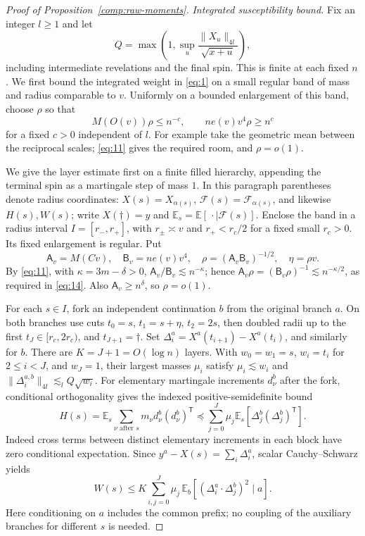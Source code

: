 \begin{proof}[Proof of Proposition~\ref{comp:raw-moments}]
\emph{Integrated susceptibility bound.}
Fix an integer $l\ge1$ and let
\[
 Q=\max\left(1,\sup_u
       \frac{\|X_u\|_{4l}}{\sqrt{x+u}}\right),
\]
including intermediate revelations and the final spin.  This is finite
at each fixed $n$.  We first bound the integrated weight in
\eqref{eq:1} on a small regular band of mass and radius comparable to
$v$.  Uniformly on a bounded enlargement of this band, choose $\rho$ so
that
\begin{equation}
 M(O(v))\rho\le n^{-c},\qquad
 ne(v)v^4\rho\ge n^c
 \tag{14}\label{eq:14}
\end{equation}
for a fixed $c>0$ independent of $l$.  For example take the geometric
mean between the reciprocal scales; \eqref{eq:11} gives the required
room, and $\rho=o(1)$.

We give the layer estimate first on a finite filled hierarchy, appending
the terminal spin as a martingale step of mass $1$.  In this paragraph
parentheses denote radius coordinates: $X(s)=X_{\alpha(s)}$,
$\mathcal F(s)=\mathcal F_{\alpha(s)}$, and likewise $H(s),W(s)$;
write $X(\dagger)=y$ and $\mathbb E_s=\mathbb E[\,\cdot\mid\mathcal F(s)]$.
Enclose the band in a radius interval $I=[r_-,r_+]$, with
$r_\pm\asymp v$ and $r_+<r_c/2$ for a fixed small $r_c>0$.
Its fixed enlargement is regular.  Put
\[
 \mathsf A_v=M(Cv),\quad \mathsf B_v=ne(v)v^4,\quad
 \rho=(\mathsf A_v\mathsf B_v)^{-1/2},\quad \eta=\rho v.
\]
By \eqref{eq:11}, with $\kappa=3m-\delta>0$,
$\mathsf A_v/\mathsf B_v\lesssim n^{-\kappa}$; hence
$\mathsf A_v\rho=(\mathsf B_v\rho)^{-1}\lesssim n^{-\kappa/2}$, as required
in \eqref{eq:14}.  Also $\mathsf A_v\ge n^\delta$, so $\rho=o(1)$.

For each $s\in I$, fork an independent continuation $b$ from the original
branch $a$.  On both branches use cuts
$t_0=s$, $t_1=s+\eta$, $t_2=2s$, then doubled radii up to the first
$t_J\in[r_c,2r_c)$, and $t_{J+1}=\dagger$.
Set $\Delta_i^a=X^a(t_{i+1})-X^a(t_i)$, and similarly for $b$.
There are $K=J+1=O(\log n)$ layers.  With
$w_0=w_1=s$, $w_i=t_i$ for $2\le i<J$, and $w_J=1$,
their largest masses $\mu_i$ satisfy
$\mu_i\lesssim w_i$ and $\|\Delta_i^{a,b}\|_{4l}\lesssim_l Q\sqrt{w_i}$.
For elementary martingale increments $d_\nu^b$ after the fork,
conditional orthogonality gives the indexed positive-semidefinite bound
\[
 H(s)=\mathbb E_s\sum_{\nu\text{ after }s}
        m_\nu d_\nu^b(d_\nu^b)^{\mathsf T}
 \preceq\sum_{j=0}^J\mu_j
        \mathbb E_s[\Delta_j^b(\Delta_j^b)^{\mathsf T}].
\]
Indeed cross terms between distinct elementary increments in each
block have zero conditional expectation.  Since
$y^a-X(s)=\sum_i\Delta_i^a$, scalar Cauchy--Schwarz yields
\[
 W(s)\le K\sum_{i,j=0}^J\mu_j\,
   \mathbb E_b[(\Delta_i^a\cdot\Delta_j^b)^2\mid a].
\]
Here conditioning on $a$ includes the common prefix; no coupling of the
auxiliary branches for different $s$ is needed.


\end{proof}
